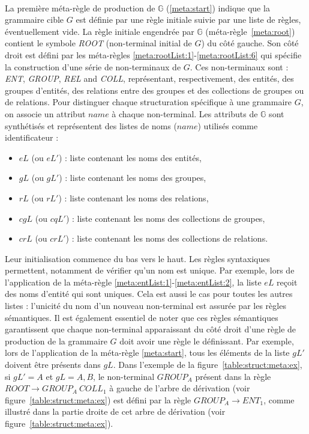 \paragraph{}
La première méta-règle de production de $\mathbb{G}$ (\ref{meta:start}) indique que la grammaire cible $G$ est définie par une règle initiale suivie par une liste de règles, éventuellement vide.
La règle initiale engendrée par $\mathbb{G}$ (méta-règle~\ref{meta:root}) contient le symbole \emph{ROOT} (non-terminal initial de $G$) du côté gauche.
Son côté droit est défini par les méta-règles \ref{meta:rootList:1}-\ref{meta:rootList:6} qui spécifie la construction d'une série de non-terminaux de $G$.
Ces non-terminaux sont : \emph{ENT}, \emph{GROUP}, \emph{REL} and \emph{COLL}, représentant, respectivement, des entités, des groupes d'entités, des relations entre des groupes et des collections de groupes ou de relations.
Pour distinguer chaque structuration spécifique à une grammaire $G$, on associe un attribut $name$ à chaque non-terminal.
Les attributs de $\mathbb{G}$ sont synthétisés et représentent des listes de noms ($name$) utilisés comme identificateur :
\begin{itemize}
    \item $eL$ (ou $eL'$) : liste contenant les noms des entités,
    \item $gL$ (ou $gL'$) : liste contenant les noms des groupes,
    \item $rL$ (ou $rL'$) : liste contenant les noms des relations,
    \item $cgL$ (ou $cqL'$) : liste contenant les noms des collections de groupes,
    \item $crL$ (ou $crL'$) : liste contenant les noms des collections de relations.
\end{itemize}

Leur initialisation commence du bas vers le haut.
Les règles syntaxiques permettent, notamment de vérifier qu'un nom est unique.
Par exemple, lors de l'application de la méta-règle \ref{meta:entList:1}-\ref{meta:entList:2}, la liste $eL$ reçoit des noms d'entité qui sont uniques.
Cela est aussi le cas pour toutes les autres listes : l'unicité du nom d'un nouveau non-terminal est assurée par les règles sémantiques.
Il est également essentiel de noter que ces règles sémantiques garantissent que chaque non-terminal apparaissant du côté droit d'une règle de production de la grammaire $G$ doit avoir une règle le définissant.
Par exemple, lors de l'application de la méta-règle \ref{meta:start}, tous les éléments de la liste $gL'$ doivent être présents dans $gL$.
Dans l'exemple de la figure~\ref{table:struct:meta:ex}, si $gL' = {A}$ et $gL = {A, B}$, le non-terminal $GROUP_A$ présent dans la règle $ROOT \rightarrow GROUP_A ~ COLL_1$ à gauche de l'arbre de dérivation (voir figure~\ref{table:struct:meta:ex}) est défini par la règle $GROUP_A \rightarrow ENT_1$, comme illustré dans la partie droite de cet arbre de dérivation (voir figure~\ref{table:struct:meta:ex}).

